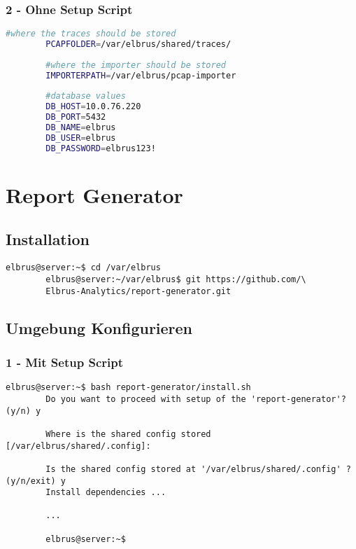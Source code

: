 \documentclass{article}
\begin{document}
	\newpage
	\subsubsection{2 - Ohne Setup Script}	
	
	\lstset{style=files}
	\begin{lstlisting}[caption={pcap-importer/.env - Anpassen an eigene Werte.}, language=bash]
		#where the traces should be stored
		PCAPFOLDER=/var/elbrus/shared/traces/
		
		#where the importer should be stored
		IMPORTERPATH=/var/elbrus/pcap-importer
		
		#database values
		DB_HOST=10.0.76.220
		DB_PORT=5432
		DB_NAME=elbrus
		DB_USER=elbrus
		DB_PASSWORD=elbrus123!
	\end{lstlisting}
	\newpage
	
	\section{Report Generator}
	\lstset{style=commands}
	\subsection{Installation}
	\begin{lstlisting}[caption={Clonen der Software von GitHub.}]
		elbrus@server:~$ cd /var/elbrus
		elbrus@server:~/var/elbrus$ git https://github.com/\
		Elbrus-Analytics/report-generator.git
	\end{lstlisting}

	\subsection[file config]{Umgebung Konfigurieren}
	
	\subsubsection{1 - Mit Setup Script}
	
	\begin{lstlisting}[caption={Ausführen des 'install.sh' Scripts.}]
		elbrus@server:~$ bash report-generator/install.sh
		Do you want to proceed with setup of the 'report-generator'? (y/n) y
		
		Where is the shared config stored [/var/elbrus/shared/.config]:
		
		Is the shared config stored at '/var/elbrus/shared/.config' ? (y/n/exit) y
		Install dependencies ...
		
		...
		
		elbrus@server:~$
	\end{lstlisting}
	
\end{document}
